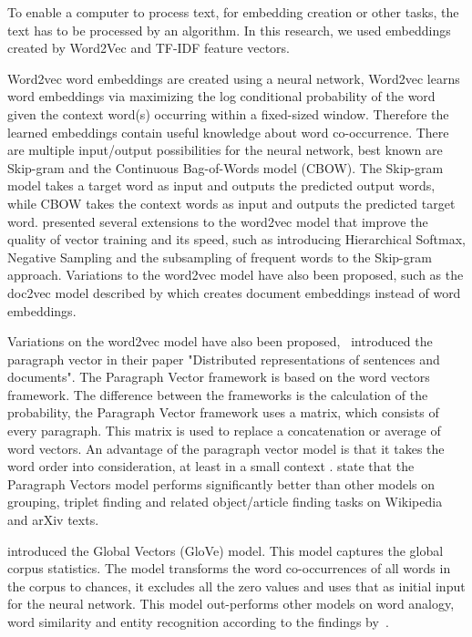 \documentclass[../../Thesis.tex]{subfiles}
\begin{document}
To enable a computer to process text, for embedding creation or other tasks, the text has to be processed by an algorithm. In this research, we used embeddings created by Word2Vec and TF-IDF feature vectors.
\begin{jumpin}
Word2vec word embeddings are created using a neural network, Word2vec learns word embeddings via maximizing the log conditional probability of the word given the context word(s) occurring within a fixed-sized window. Therefore the learned embeddings contain useful knowledge about word co-occurrence\cite{nalisnick2016improving}. There are multiple input/output possibilities for the neural network, best known are Skip-gram and the Continuous Bag-of-Words model (CBOW). The Skip-gram model takes a target word as input and outputs the predicted output words, while CBOW takes the context words as input and outputs the predicted target word\cite{nalisnick2016improving, pennington2014glove}. \citet{mikolov2013distributed}\cite{mikolov2013efficient} presented several extensions to the word2vec model that improve the quality of vector training and its speed, such as introducing Hierarchical Softmax, Negative Sampling and the subsampling of frequent words to the Skip-gram approach. Variations to the word2vec model have also been proposed, such as the doc2vec model described by \citet{lau2016empirical} which creates document embeddings instead of word embeddings.

Variations on the word2vec model have also been proposed,~\citet{le2014distributed} introduced the paragraph vector in their paper "Distributed representations of sentences and documents". The Paragraph Vector framework is based on the word vectors framework. The difference between the frameworks is the calculation of the probability, the Paragraph Vector framework uses a matrix, which consists of every paragraph. This matrix is used to replace a concatenation or average of word vectors. An advantage of the paragraph vector model is that it takes the word order into consideration, at least in a small context \cite{le2014distributed}. \citet{dai2015document} state that the Paragraph Vectors model performs significantly better than other models on grouping, triplet finding and related object/article finding tasks on Wikipedia and arXiv texts.

\citet{pennington2014glove} introduced the Global Vectors (GloVe) model. This model captures the global corpus statistics. The model transforms the word co-occurrences of all words in the corpus to chances, it excludes all the zero values and uses that as initial input for the neural network. This model out-performs other models on word analogy, word similarity and entity recognition according to the findings by~\citet{pennington2014glove}.\\


\end{jumpin}
\end{document}
